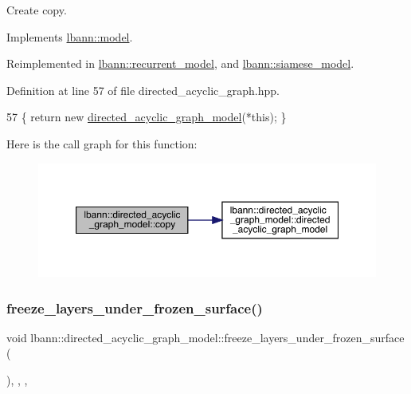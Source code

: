 Create copy. 

Implements \hyperlink{classlbann_1_1model_aacd024c11f0897b33a7e7838b9433ba2}{lbann\+::model}.



Reimplemented in \hyperlink{classlbann_1_1recurrent__model_ad184f898241fe026f140db689f129d47}{lbann\+::recurrent\+\_\+model}, and \hyperlink{classlbann_1_1siamese__model_a26bbedec5306e47e214124cca2cb381b}{lbann\+::siamese\+\_\+model}.



Definition at line 57 of file directed\+\_\+acyclic\+\_\+graph.\+hpp.


\begin{DoxyCode}
57 \{ \textcolor{keywordflow}{return} \textcolor{keyword}{new} \hyperlink{classlbann_1_1directed__acyclic__graph__model_a2b5f8058b341073a0a95d4882fb4ff52}{directed\_acyclic\_graph\_model}(*\textcolor{keyword}{this}); \}
\end{DoxyCode}
Here is the call graph for this function\+:\nopagebreak
\begin{figure}[H]
\begin{center}
\leavevmode
\includegraphics[width=350pt]{classlbann_1_1directed__acyclic__graph__model_a6a21050a732686e9e6c9f384ff9fda51_cgraph}
\end{center}
\end{figure}
\mbox{\label{classlbann_1_1directed__acyclic__graph__model_a9f2a6e9472235ec91c5a50356471b3cb}} 
\subsubsection{\texorpdfstring{freeze\+\_\+layers\+\_\+under\+\_\+frozen\+\_\+surface()}{freeze\_layers\_under\_frozen\_surface()}}
{\footnotesize\ttfamily void lbann\+::directed\+\_\+acyclic\+\_\+graph\+\_\+model\+::freeze\+\_\+layers\+\_\+under\+\_\+frozen\+\_\+surface (\begin{DoxyParamCaption}{ }\end{DoxyParamCaption})\hspace{0.3cm}{\ttfamily [inline]}, {\ttfamily [override]}, {\ttfamily [protected]}, {\ttfamily [virtual]}}

